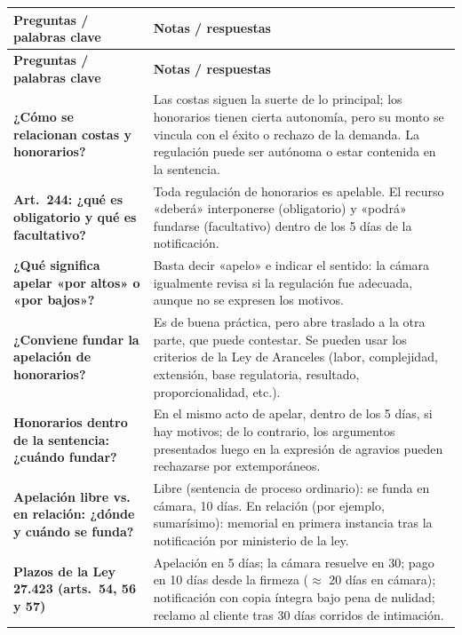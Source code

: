 \documentclass[12pt,oneside]{book}
\begin{document}
\begin{longtable}{>{\raggedright\arraybackslash}p{}>{\raggedright\arraybackslash}p{}}
\toprule
\textbf{Preguntas / palabras clave} & \textbf{Notas / respuestas} \\
\midrule
\endfirsthead
\toprule
\textbf{Preguntas / palabras clave} & \textbf{Notas / respuestas} \\
\midrule
\endhead

\textbf{¿Cómo se relacionan costas y honorarios?} &
Las costas siguen la suerte de lo principal; los honorarios tienen cierta autonomía, pero su monto se vincula con el éxito o rechazo de la demanda. La regulación puede ser autónoma o estar contenida en la sentencia. \\[0.6em]

\textbf{Art.~244: ¿qué es obligatorio y qué es facultativo?} &
Toda regulación de honorarios es apelable. El recurso «deberá» interponerse (obligatorio) y «podrá» fundarse (facultativo) dentro de los 5 días de la notificación. \\[0.6em]

\textbf{¿Qué significa apelar «por altos» o «por bajos»?} &
Basta decir «apelo» e indicar el sentido: la cámara igualmente revisa si la regulación fue adecuada, aunque no se expresen los motivos. \\[0.6em]

\textbf{¿Conviene fundar la apelación de honorarios?} &
Es de buena práctica, pero abre traslado a la otra parte, que puede contestar. Se pueden usar los criterios de la Ley de Aranceles (labor, complejidad, extensión, base regulatoria, resultado, proporcionalidad, etc.). \\[0.6em]

\textbf{Honorarios dentro de la sentencia: ¿cuándo fundar?} &
En el mismo acto de apelar, dentro de los 5 días, si hay motivos; de lo contrario, los argumentos presentados luego en la expresión de agravios pueden rechazarse por extemporáneos. \\[0.6em]

\textbf{Apelación libre vs. en relación: ¿dónde y cuándo se funda?} &
Libre (sentencia de proceso ordinario): se funda en cámara, 10 días. En relación (por ejemplo, sumarísimo): memorial en primera instancia tras la notificación por ministerio de la ley. \\[0.6em]

\textbf{Plazos de la Ley 27.423 (arts.~54, 56 y 57)} &
Apelación en 5 días; la cámara resuelve en 30; pago en 10 días desde la firmeza ($\approx$ 20 días en cámara); notificación con copia íntegra bajo pena de nulidad; reclamo al cliente tras 30 días corridos de intimación. \\[0.6em]


\end{longtable}
\end{document}
